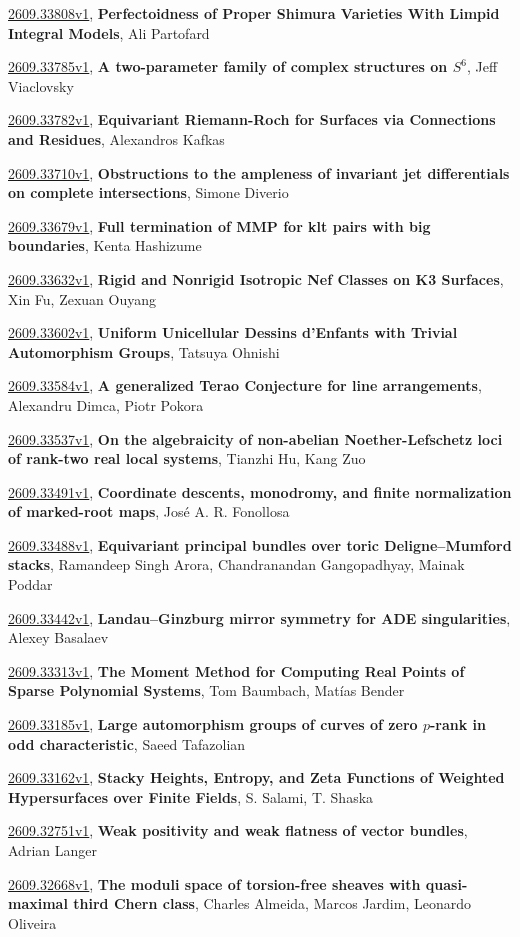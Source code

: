 \documentclass[9pt, a4paper]{article}
\theoremstyle{plain}
\theoremstyle{definition}
\theoremstyle{remark}
\newcommand{\arxiv}[3]{\href{https://arxiv.org/abs/#1}{#1}, \textbf{\textcolor{arxivblue}{#2}}, #3}
\begin{document}
\arxiv{2609.33808v1}{Perfectoidness of Proper Shimura Varieties With Limpid Integral Models}{Ali Partofard}

\arxiv{2609.33785v1}{A two-parameter family of complex structures on $S^6$}{Jeff Viaclovsky}

\arxiv{2609.33782v1}{Equivariant Riemann-Roch for Surfaces via Connections and Residues}{Alexandros Kafkas}

\arxiv{2609.33710v1}{Obstructions to the ampleness of invariant jet differentials on complete intersections}{Simone Diverio}

\arxiv{2609.33679v1}{Full termination of MMP for klt pairs with big boundaries}{Kenta Hashizume}

\arxiv{2609.33632v1}{Rigid and Nonrigid Isotropic Nef Classes on K3 Surfaces}{Xin Fu, Zexuan Ouyang}

\arxiv{2609.33602v1}{Uniform Unicellular Dessins d'Enfants with Trivial Automorphism Groups}{Tatsuya Ohnishi}

\arxiv{2609.33584v1}{A generalized Terao Conjecture for line arrangements}{Alexandru Dimca, Piotr Pokora}

\arxiv{2609.33537v1}{On the algebraicity of non-abelian Noether-Lefschetz loci of rank-two real local systems}{Tianzhi Hu, Kang Zuo}

\arxiv{2609.33491v1}{Coordinate descents, monodromy, and finite normalization of marked-root maps}{José A. R. Fonollosa}

\arxiv{2609.33488v1}{Equivariant principal bundles over toric Deligne--Mumford stacks}{Ramandeep Singh Arora, Chandranandan Gangopadhyay, Mainak Poddar}

\arxiv{2609.33442v1}{Landau--Ginzburg mirror symmetry for ADE singularities}{Alexey Basalaev}

\arxiv{2609.33313v1}{The Moment Method for Computing Real Points of Sparse Polynomial Systems}{Tom Baumbach, Matías Bender}

\arxiv{2609.33185v1}{Large automorphism groups of curves of zero $p$-rank in odd characteristic}{Saeed Tafazolian}

\arxiv{2609.33162v1}{Stacky Heights, Entropy, and Zeta Functions of Weighted Hypersurfaces over Finite Fields}{S. Salami, T. Shaska}

\arxiv{2609.32751v1}{Weak positivity and weak flatness of vector bundles}{Adrian Langer}

\arxiv{2609.32668v1}{The moduli space of torsion-free sheaves with quasi-maximal third Chern class}{Charles Almeida, Marcos Jardim, Leonardo Oliveira}
\end{document}
